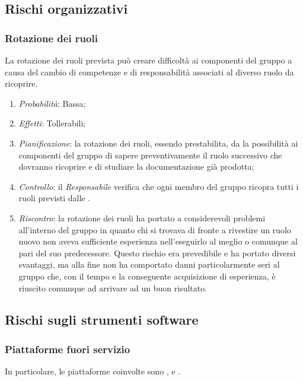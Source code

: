 	\subsection{Rischi organizzativi}
	
		\subsubsection{Rotazione dei ruoli}

La rotazione dei ruoli prevista può creare difficoltà ai componenti del gruppo a causa del cambio di competenze e di responsabilità associati al diverso ruolo da ricoprire.

\begin{enumerate}
\item \textit{Probabilità}: Bassa;
\item \textit{Effetti}: Tollerabili;
\item \textit{Pianificazione}: la rotazione dei ruoli, essendo prestabilita, da la possibilità ai componenti del gruppo di sapere preventivamente il ruolo successivo che dovranno ricoprire e di studiare la documentazione già prodotta;
\item \textit{Controllo}: il \emph{Responsabile} verifica che ogni membro del gruppo ricopra tutti i ruoli previsti dalle \NormeDiProgetto{}.
\item \textit{Riscontro}: la rotazione dei ruoli ha portato a considerevoli problemi all'interno del gruppo in quanto chi si trovava di fronte a rivestire un ruolo nuovo non aveva sufficiente esperienza nell'eseguirlo al meglio o comunque al pari del suo predecessore. Questo rischio era prevedibile e ha portato diversi svantaggi, ma alla fine non ha comportato danni particolarmente seri al gruppo che, con il tempo e la conseguente acquisizione di esperienza, è riuscito comunque ad arrivare ad un buon risultato.
\end{enumerate}
	
	\subsection{Rischi sugli strumenti software}
	
		\subsubsection{Piattaforme fuori servizio}	

In particolare, le piattaforme coinvolte sono ,  e . 


